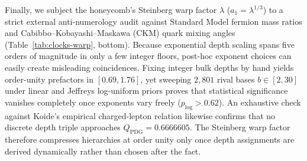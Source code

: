 Finally, we subject the honeycomb's Steinberg warp factor $\lambda$ ($a_1 = \lambda^{1/3}$) to a strict external
anti-numerology audit against Standard Model fermion mass ratios and Cabibbo--Kobayashi--Maskawa (CKM) quark mixing
angles (Table~\ref{tab:clocks-warp}, bottom). Because exponential depth scaling spans five orders of magnitude in only a
few integer floors, post-hoc exponent choices can easily create misleading coincidences. Fixing integer bulk depths by
hand yields order-unity prefactors in $[0.69, 1.76]$, yet sweeping $2{,}801$ rival bases $b \in [2, 30]$ under linear and
Jeffreys log-uniform priors proves that statistical significance vanishes completely once exponents vary freely
($p_{\mathrm{log}} > 0.62$). An exhaustive check against Koide's empirical charged-lepton relation \cite{koide1983}
likewise confirms that no discrete depth triple approaches $Q_{\mathrm{PDG}} = 0.6666605$. The Steinberg warp factor
therefore compresses hierarchies at order unity only once depth assignments are derived dynamically rather than chosen
after the fact.
